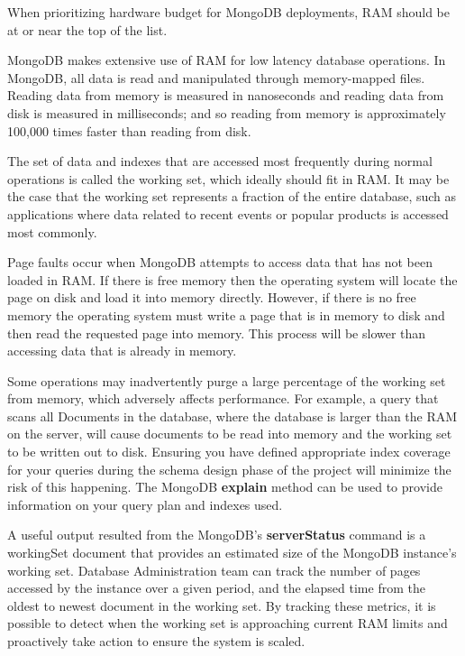 \documentclass[9pt,twocolumn,twoside]{../../styles/osajnl}
\begin{document}
\cite{www-mongo4} When prioritizing hardware budget for MongoDB deployments, RAM should be at or near the top of the list.

MongoDB makes extensive use of RAM for low latency database operations. In MongoDB, all data is read and manipulated through memory-mapped files. Reading data from memory is measured in nanoseconds and reading data from disk is measured in milliseconds; and so reading from memory is approximately 100,000 times faster than reading from disk.

The set of data and indexes that are accessed most frequently during normal operations is called the working set, which ideally should fit in RAM. It may be the case that the working set represents a fraction of the entire database, such as applications where data related to recent events or popular products is accessed most commonly.

Page faults occur when MongoDB attempts to access data that has not been loaded in RAM. If there is free memory then the operating system will locate the page on disk and load it into memory directly. However, if there is no free memory the operating system must write a page that is in memory to disk and then read the requested page into memory. This process will be slower than accessing data that is already in memory.

Some operations may inadvertently purge a large percentage of the working set from memory, which adversely affects performance. For example, a query that scans all Documents in the database, where the database is larger than the RAM on the server, will cause documents to be read into memory and the working set to be written out to disk. Ensuring you have defined appropriate index coverage for your queries during the schema design phase of the project will minimize the risk of this happening. The MongoDB {\bfseries explain} method can be used to provide information on your query plan and indexes used.

A useful output resulted from the MongoDB’s {\bfseries serverStatus} command is a workingSet document that provides an estimated size of the MongoDB instance’s working set. Database Administration team can track the number of pages accessed by the instance over a given period, and the elapsed time from the oldest to newest document in the working set. By tracking these metrics, it is possible to detect when the working set is approaching current RAM limits and proactively take action to ensure the system is scaled.
\end{document}
